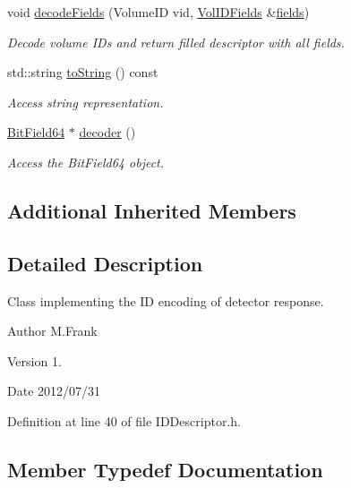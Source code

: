 \begin{DoxyCompactItemize}
void \hyperlink{class_d_d4hep_1_1_geometry_1_1_i_d_descriptor_ad946d0b1977723b917f4092cf039235c}{decode\+Fields} (Volume\+ID vid, \hyperlink{class_d_d4hep_1_1_geometry_1_1_i_d_descriptor_a6c4700a96f3a202eedaa25e54d5695ff}{Vol\+I\+D\+Fields} \&\hyperlink{class_d_d4hep_1_1_geometry_1_1_i_d_descriptor_ad233517890d70599ba9f3c7f339cd26a}{fields})
\begin{DoxyCompactList}\small\item\em Decode volume I\+Ds and return filled descriptor with all fields. \end{DoxyCompactList}\item 
std\+::string \hyperlink{class_d_d4hep_1_1_geometry_1_1_i_d_descriptor_a0e4113ffe3560b7cef6da4e880d827f3}{to\+String} () const
\begin{DoxyCompactList}\small\item\em Access string representation. \end{DoxyCompactList}\item 
\hyperlink{class_d_d4hep_1_1_d_d_segmentation_1_1_bit_field64}{Bit\+Field64} $\ast$ \hyperlink{class_d_d4hep_1_1_geometry_1_1_i_d_descriptor_ac62f98d6db97a51cadb2f17c58369d18}{decoder} ()
\begin{DoxyCompactList}\small\item\em Access the Bit\+Field64 object. \end{DoxyCompactList}\end{DoxyCompactItemize}
\subsection*{Additional Inherited Members}


\subsection{Detailed Description}
Class implementing the ID encoding of detector response. 

\begin{DoxyAuthor}{Author}
M.\+Frank 
\end{DoxyAuthor}
\begin{DoxyVersion}{Version}
1. 
\end{DoxyVersion}
\begin{DoxyDate}{Date}
2012/07/31 
\end{DoxyDate}


Definition at line 40 of file I\+D\+Descriptor.\+h.



\subsection{Member Typedef Documentation}
\hypertarget{class_d_d4hep_1_1_geometry_1_1_i_d_descriptor_ac06f5915e74f8a8f2ff73e9a322556e4}{}\label{class_d_d4hep_1_1_geometry_1_1_i_d_descriptor_ac06f5915e74f8a8f2ff73e9a322556e4} 
